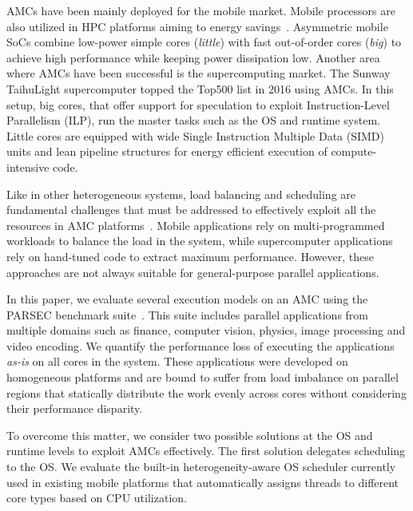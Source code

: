 AMCs have been mainly deployed for the mobile market. 
Mobile processors are also utilized in HPC platforms aiming to energy savings~\cite{ARMV8}.
Asymmetric mobile SoCs combine low-power simple cores (\emph{little}) with fast out-of-order cores (\emph{big}) to achieve high performance while keeping power dissipation low.
Another area where AMCs have been successful is the supercomputing market.
The Sunway TaihuLight supercomputer topped the Top500 list in 2016 using AMCs. 
In this setup, big cores, that offer support for speculation to exploit Instruction-Level Parallelism (ILP), run the master tasks such as the OS and runtime system.
Little cores are equipped with wide Single Instruction Multiple Data (SIMD) units and lean pipeline structures for energy efficient execution of compute-intensive code. 

Like in other heterogeneous systems, load balancing and scheduling are fundamental challenges that must be addressed to effectively exploit all the resources in AMC platforms~\cite{Suleman:APLOS2009,Fedorova2009,Greenhalgh2011,Joao:ASPLOS2012,Joao:ISCA2013,ARM4HPC_SC13}. 
Mobile applications rely on multi-programmed workloads to balance the load in the system, while supercomputer applications rely on hand-tuned code to extract maximum performance. 
However, these approaches are not always suitable for general-purpose parallel applications.

In this paper, we evaluate several execution models on an AMC using the PARSEC benchmark suite~\cite{PARSEC3}. 
This suite includes parallel applications from multiple domains such as finance, computer vision, physics, image processing and video encoding. 
We quantify the performance loss of executing the applications \textit{as-is} on all cores in the system. 
These applications were developed on homogeneous platforms and are bound to suffer from load imbalance on parallel regions that statically distribute the work evenly across cores without considering their performance disparity.

To overcome this matter, we consider two possible solutions at the OS and runtime levels to exploit AMCs effectively.
The first solution delegates scheduling to the OS.
We evaluate the built-in heterogeneity-aware OS scheduler currently used in existing mobile platforms that automatically assigns threads to different core types based on CPU utilization. 

